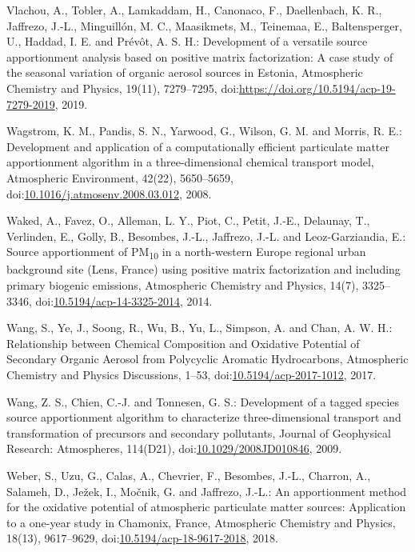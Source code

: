 \documentclass[
]{article}
\begin{document}
Vlachou, A., Tobler, A., Lamkaddam, H., Canonaco, F., Daellenbach, K.
R., Jaffrezo, J.-L., Minguillón, M. C., Maasikmets, M., Teinemaa, E.,
Baltensperger, U., Haddad, I. E. and Prévôt, A. S. H.: Development of a
versatile source apportionment analysis based on positive matrix
factorization: A case study of the seasonal variation of organic aerosol
sources in Estonia, Atmospheric Chemistry and Physics, 19(11),
7279--7295,
doi:\href{https://doi.org/https://doi.org/10.5194/acp-19-7279-2019}{https://doi.org/10.5194/acp-19-7279-2019},
2019.

Wagstrom, K. M., Pandis, S. N., Yarwood, G., Wilson, G. M. and Morris,
R. E.: Development and application of a computationally efficient
particulate matter apportionment algorithm in a three-dimensional
chemical transport model, Atmospheric Environment, 42(22), 5650--5659,
doi:\href{https://doi.org/10.1016/j.atmosenv.2008.03.012}{10.1016/j.atmosenv.2008.03.012},
2008.

Waked, A., Favez, O., Alleman, L. Y., Piot, C., Petit, J.-E., Delaunay,
T., Verlinden, E., Golly, B., Besombes, J.-L., Jaffrezo, J.-L. and
Leoz-Garziandia, E.: Source apportionment of PM\textsubscript{10} in a
north-western Europe regional urban background site (Lens, France) using
positive matrix factorization and including primary biogenic emissions,
Atmospheric Chemistry and Physics, 14(7), 3325--3346,
doi:\href{https://doi.org/10.5194/acp-14-3325-2014}{10.5194/acp-14-3325-2014},
2014.

Wang, S., Ye, J., Soong, R., Wu, B., Yu, L., Simpson, A. and Chan, A. W.
H.: Relationship between Chemical Composition and Oxidative Potential of
Secondary Organic Aerosol from Polycyclic Aromatic Hydrocarbons,
Atmospheric Chemistry and Physics Discussions, 1--53,
doi:\href{https://doi.org/10.5194/acp-2017-1012}{10.5194/acp-2017-1012},
2017.

Wang, Z. S., Chien, C.-J. and Tonnesen, G. S.: Development of a tagged
species source apportionment algorithm to characterize three-dimensional
transport and transformation of precursors and secondary pollutants,
Journal of Geophysical Research: Atmospheres, 114(D21),
doi:\href{https://doi.org/10.1029/2008JD010846}{10.1029/2008JD010846},
2009.

Weber, S., Uzu, G., Calas, A., Chevrier, F., Besombes, J.-L., Charron,
A., Salameh, D., Ježek, I., Močnik, G. and Jaffrezo, J.-L.: An
apportionment method for the oxidative potential of atmospheric
particulate matter sources: Application to a one-year study in Chamonix,
France, Atmospheric Chemistry and Physics, 18(13), 9617--9629,
doi:\href{https://doi.org/10.5194/acp-18-9617-2018}{10.5194/acp-18-9617-2018},
2018.
\end{document}
